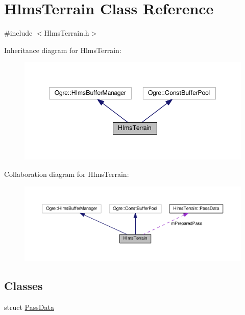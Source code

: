 \hypertarget{class_hlms_terrain}{}\section{Hlms\+Terrain Class Reference}
\label{class_hlms_terrain}


{\ttfamily \#include $<$Hlms\+Terrain.\+h$>$}



Inheritance diagram for Hlms\+Terrain\+:\nopagebreak
\begin{figure}[H]
\begin{center}
\leavevmode
\includegraphics[width=346pt]{class_hlms_terrain__inherit__graph}
\end{center}
\end{figure}


Collaboration diagram for Hlms\+Terrain\+:\nopagebreak
\begin{figure}[H]
\begin{center}
\leavevmode
\includegraphics[width=350pt]{class_hlms_terrain__coll__graph}
\end{center}
\end{figure}
\subsection*{Classes}
\begin{DoxyCompactItemize}
\item 
struct \hyperlink{struct_hlms_terrain_1_1_pass_data}{Pass\+Data}
\end{DoxyCompactItemize}

